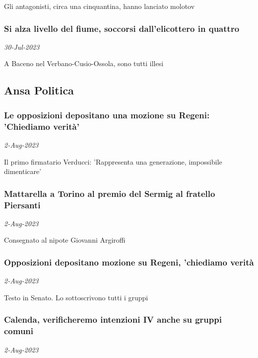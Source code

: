 Gli antagonisti, circa una cinquantina, hanno lanciato molotov
\subsubsection{Si alza livello del fiume, soccorsi dall'elicottero in quattro \href{https://www.ansa.it/sito/notizie/cronaca/2023/07/30/si-alza-livello-del-fiume-soccorsi-dallelicottero-in-quattro_920226e1-b945-4787-9d6f-c0bfd145d4e8.html}{}}
\textit{30-Jul-2023}

A Baceno nel Verbano-Cusio-Ossola, sono tutti illesi
\subsection{Ansa Politica \href{https://www.ansa.it/sito/notizie/politica/politica.shtml}{}}
\subsubsection{Le opposizioni depositano una mozione su Regeni: 'Chiediamo verit\`{a}' \href{https://www.ansa.it/sito/notizie/politica/2023/08/02/le-opposizioni-depositano-una-mozione-su-regeni-chiediamo-verita_9c4b8850-9c03-4283-9385-18016a49cdd8.html}{}}
\textit{2-Aug-2023}

Il primo firmatario Verducci: 'Rappresenta una generazione, impossibile dimenticare'
\subsubsection{Mattarella a Torino al premio del Sermig al fratello Piersanti \href{https://www.ansa.it/sito/notizie/politica/2023/08/02/mattarella-a-torino-al-premio-del-sermig-al-fratello-piersanti_6886c3e3-11c1-49ca-9b3c-9d3c785453c2.html}{}}
\textit{2-Aug-2023}

Consegnato al nipote Giovanni Argiroffi
\subsubsection{Opposizioni depositano mozione su Regeni, 'chiediamo verit\`{a} \href{https://www.ansa.it/sito/notizie/politica/2023/08/02/opposizioni-depositano-mozione-su-regeni-chiediamo-verita_4cee4f68-1ed6-4780-8b73-c6f62f61337b.html}{}}
\textit{2-Aug-2023}

Testo in Senato. Lo sottoscrivono tutti i gruppi
\subsubsection{Calenda, verificheremo intenzioni IV anche su gruppi comuni \href{https://www.ansa.it/sito/notizie/politica/2023/08/02/calenda-verificheremo-intenzioni-iv-anche-su-gruppi-comuni_47007cbe-542c-4ed1-9f05-2d86f441d892.html}{}}
\textit{2-Aug-2023}


